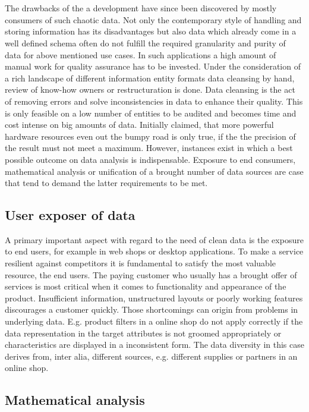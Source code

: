 \\\\
The drawbacks of the a development have since been discovered by mostly consumers of such chaotic data. Not only the contemporary style of handling and storing information has its disadvantages but also data which already come in a well defined schema often do not fulfill the required granularity and purity of data for above mentioned use cases. In such applications a high amount of manual work for quality assurance has to be invested. Under the consideration of a rich landscape of different information entity formats data cleansing by hand, review of know-how owners or restructuration is done. Data cleansing is the act of removing errors and solve inconsistencies in data to enhance their quality. This is only feasible on a low number of entities to be audited and becomes time and cost intense on big amounts of data. Initially claimed, that more powerful hardware resources even out the bumpy road is only true, if the the precision of the result must not meet a maximum. However, instances exist in which a best possible outcome on data analysis is indispensable. Exposure to end consumers, mathematical analysis or unification of a brought number of data sources are case that tend to demand the latter requirements to be met. 

\subsection{User exposer of data}

A primary important aspect with regard to the need of clean data is the exposure to end users, for example in web shops or desktop applications. To make a service resilient against competitors it is fundamental to satisfy the most valuable resource, the end users. The paying customer who usually has a brought offer of services is most critical when it comes to functionality and appearance of the product. Insufficient information, unstructured layouts or poorly working features discourages a customer quickly. Those shortcomings can origin from problems in underlying data. E.g. product filters in a online shop do not apply correctly if the data representation in the target attributes is not groomed appropriately or characteristics are displayed in a inconsistent form. The data diversity in this case derives from, inter alia, different sources, e.g. different supplies or partners in an online shop.

\subsection{Mathematical analysis} 

